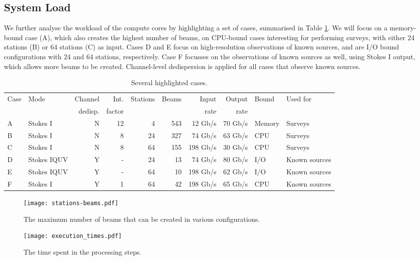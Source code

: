 \documentclass{llncs}
\begin{document}
\subsection{System Load}

We further analyse the workload of the compute cores by highlighting a set of cases, summarised in Table \ref{table:cases}. We will focus on a memory-bound case (A), which also creates the highest number of beams, on CPU-bound cases interesting for performing surveys, with either 24 stations (B) or 64 stations (C) as input. Cases D and E focus on high-resolution observations of known sources, and are I/O bound configurations with 24 and 64 stations, respectively. Case F focusses on the observations of known sources as well, using Stokes I output, which allows more beams to be created. Channel-level dedispersion is applied for all cases that observe known sources.

\begin{table}[ht]
\center
\begin{tabular}{l|l|r|r|r|r|r|r|l|l}
Case & Mode & Channel & Int. & Stations & Beams  & Input & Output & Bound & Used for \\
     &      & dedisp. & factor      &          &        & rate  & rate   &       & \\
\hline
\hline
A & Stokes I    & N & 12 &  4 & 543 &  12 Gb/s & 70 Gb/s & Memory & Surveys \\
B & Stokes I    & N &  8 & 24 & 327 &  74 Gb/s & 63 Gb/s & CPU   & Surveys \\
C & Stokes I    & N &  8 & 64 & 155 & 198 Gb/s & 30 Gb/s & CPU   & Surveys \\  
D & Stokes IQUV & Y & - & 24 &  13 &  74 Gb/s & 80 Gb/s & I/O   & Known sources \\
E & Stokes IQUV & Y & - & 64 &  10 & 198 Gb/s & 62 Gb/s & I/O   & Known sources \\
F & Stokes I    & Y & 1 & 64 &  42 & 198 Gb/s & 65 Gb/s & CPU   & Known sources 
\end{tabular}
\caption{Several highlighted cases.}
\label{table:cases}
\end{table}

\begin{figure}[ht]
\begin{minipage}[t]{0.47\textwidth}
\texttt{[image: stations-beams.pdf]}
\label{fig:stations-beams}
\caption{The maximum number of beams that can be created in various configurations.}
\end{minipage}
\hfill
\begin{minipage}[t]{0.47\textwidth}
\texttt{[image: execution\_times.pdf]}
\label{fig:execution-times}
\caption{The time spent in the processing steps.}
\end{minipage}
\end{figure}
\end{document}
